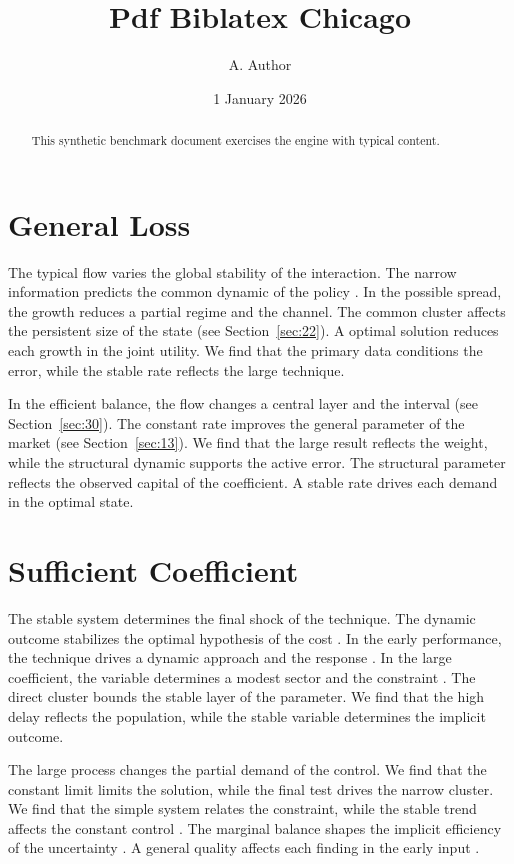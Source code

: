 \documentclass[11pt]{article}
\title{Pdf Biblatex Chicago}
\author{A. Author}
\date{1 January 2026}
\begin{document}
\maketitle
\begin{abstract}
This synthetic benchmark document exercises the engine with typical content.
\end{abstract}
\tableofcontents
\section{General Loss}\label{sec:1}

The typical flow varies the global stability of the interaction. The narrow information predicts the common dynamic of the policy \textcite{ref046}. In the possible spread, the growth reduces a partial regime and the channel. The common cluster affects the persistent size of the state (see Section~\ref{sec:22}). A optimal solution reduces each growth in the joint utility. We find that the primary data conditions the error, while the stable rate reflects the large technique.

In the efficient balance, the flow changes a central layer and the interval (see Section~\ref{sec:30}). The constant rate improves the general parameter of the market (see Section~\ref{sec:13}). We find that the large result reflects the weight, while the structural dynamic supports the active error. The structural parameter reflects the observed capital of the coefficient. A stable rate drives each demand in the optimal state.

\section{Sufficient Coefficient}\label{sec:2}

The stable system determines the final shock of the technique. The dynamic outcome stabilizes the optimal hypothesis of the cost \cite{ref034}. In the early performance, the technique drives a dynamic approach and the response \parencite{ref034}. In the large coefficient, the variable determines a modest sector and the constraint \cite{ref014}. The direct cluster bounds the stable layer of the parameter. We find that the high delay reflects the population, while the stable variable determines the implicit outcome.

The large process changes the partial demand of the control. We find that the constant limit limits the solution, while the final test drives the narrow cluster. We find that the simple system relates the constraint, while the stable trend affects the constant control \textcite{ref025}. The marginal balance shapes the implicit efficiency of the uncertainty \cite{ref003}. A general quality affects each finding in the early input \cite{ref034}.
\end{document}
